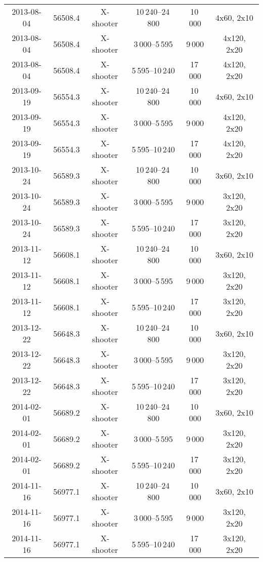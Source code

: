 \documentclass[structabstract]{aa}
\begin{document}
\begin{appendix}
\begin{longtable}{cccccc}
2013-08-04	&	56508.4	&	X-shooter	&	10\,240--24\,800	& 10\,000 &	4x60, 2x10	\\
2013-08-04 	&	56508.4	&	X-shooter	&	3\,000--5\,595	& 9\,000 &	4x120, 2x20	\\
2013-08-04 	&	56508.4	&	X-shooter	&	5\,595--10\,240	& 17\,000 &	4x120, 2x20	\\

2013-09-19	&	56554.3	&	X-shooter	&	10\,240--24\,800	& 10\,000 &	4x60, 2x10	\\
2013-09-19 	&	56554.3	&	X-shooter	&	3\,000--5\,595	& 9\,000 &	4x120, 2x20	\\
2013-09-19 	&	56554.3	&	X-shooter	&	5\,595--10\,240	& 17\,000 &	4x120, 2x20	\\

2013-10-24	&	56589.3	&	X-shooter	&	10\,240--24\,800	& 10\,000 &	3x60, 2x10	\\
2013-10-24 	&	56589.3	&	X-shooter	&	3\,000--5\,595	& 9\,000 &	3x120, 2x20	\\
2013-10-24 	&	56589.3	&	X-shooter	&	5\,595--10\,240	& 17\,000 &	3x120, 2x20	\\

2013-11-12	&	56608.1	&	X-shooter	&	10\,240--24\,800	& 10\,000 &	3x60, 2x10	\\
2013-11-12 	&	56608.1	&	X-shooter	&	3\,000--5\,595	& 9\,000 &	3x120, 2x20	\\
2013-11-12 	&	56608.1	&	X-shooter	&	5\,595--10\,240	& 17\,000 &	3x120, 2x20	\\

2013-12-22	&	56648.3	&	X-shooter	&	10\,240--24\,800	& 10\,000 &	3x60, 2x10	\\
2013-12-22 	&	56648.3	&	X-shooter	&	3\,000--5\,595	& 9\,000 &	3x120, 2x20	\\
2013-12-22 	&	56648.3	&	X-shooter	&	5\,595--10\,240	& 17\,000 &	3x120, 2x20	\\

2014-02-01	&	56689.2	&	X-shooter	&	10\,240--24\,800	& 10\,000 &	3x60, 2x10	\\
2014-02-01 	&	56689.2	&	X-shooter	&	3\,000--5\,595	& 9\,000 &	3x120, 2x20	\\
2014-02-01 	&	56689.2	&	X-shooter	&	5\,595--10\,240	& 17\,000 &	3x120, 2x20	\\

2014-11-16	&	56977.1	&	X-shooter	&	10\,240--24\,800	& 10\,000 &	3x60, 2x10	\\
2014-11-16 	&	56977.1	&	X-shooter	&	3\,000--5\,595	& 9\,000 &	3x120, 2x20	\\
2014-11-16 	&	56977.1	&	X-shooter	&	5\,595--10\,240	& 17\,000 &	3x120, 2x20	\\


\end{longtable}
\end{appendix}
\end{document}
